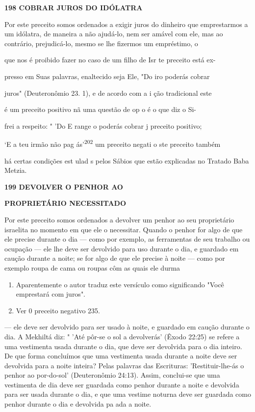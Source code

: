 \begin{itemize}
\begin{enumrate}
\begin{itemize}
\begin{itemize}
\begin{itemize}
\textbf{198 COBRAR JUROS DO IDÓLATRA}

Por este preceito somos ordenados a exigir juros do dinheiro que
emprestarmos a um idólatra, de maneira a não ajudá-lo, nem ser amável
com ele, mas ao contrário, prejudicá-lo, mesmo se lhe fizermos um
empréstimo, o

que nos é proibido fazer no caso de um filho de Isr te preceito está ex-

presso em Suas palavras, enaltecido seja Ele, "Do iro poderás cobrar

juros" (Deuteronômio 23. 1), e de acordo com a i ção tradicional este

é um preceito positivo nã uma questão de op o é o que diz o Si-

frei a respeito: " 'Do E range o poderás cobrar j preceito positivo;

`E a teu irmão não pag ás'\textsuperscript{202} um preceito negati o ste
preceito também

há certas condições est ulad s pelos Sábios que estão explicadas no
Tratado Baba Metzia.

\textbf{199 DEVOLVER O PENHOR AO}

\textbf{PROPRIETÁRIO NECESSITADO}

Por este preceito somos ordenados a devolver um penhor ao seu
proprietário israelita no momento em que ele o necessitar. Quando o
penhor for algo de que ele precise durante o dia --- como por exemplo,
as ferramentas de seu trabalho ou ocupação --- ele lhe deve ser
devolvido para uso durante o dia, e guardado em caução durante a noite;
se for algo de que ele precise à noite --- como por exemplo roupa de
cama ou roupas côm as quais ele durma


\begin{enumerate}
\def\labelenumi{\arabic{enumi}.}
\setcounter{enumi}{200}
\item
 
 Aparentemente o autor traduz este versículo como significando "Você
 emprestará com juros".
 
\item
 
 Ver 0 preceito negativo 235.
 
\end{enumerate}




--- ele deve ser devolvido para ser usado à noite, e guardado em caução
duran­te o dia. A Mekhiltá diz: " 'Até pôr-se o sol a devolverás' (Êxodo
22:25) se refe­re a uma vestimenta usada durante o dia, que deve ser
devolvida para o dia inteiro. De que forma concluímos que uma vestimenta
usada durante a noite deve ser devolvida para a noite inteira? Pelas
palavras das Escrituras: 'Restituir-lhe-ás o penhor ao por-do-sol'
(Deuteronômio 24:13). Assim, conclui-se que uma vestimenta de dia deve
ser guardada como penhor durante a noite e de­volvida para ser usada
durante o dia, e que uma vestime noturna deve ser guardada como penhor
durante o dia e devolvida pa ada a noite.



\end{itemize}
\end{itemize}
\end{itemize}
\end{enumrate}
\end{itemize}
